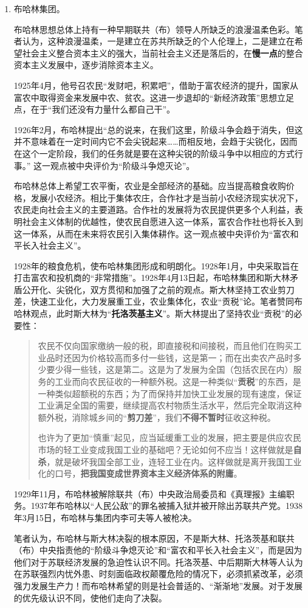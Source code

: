 \begin{enumerate}
\item 布哈林集团。

  布哈林思想总体上持有一种早期联共（布）领导人所缺乏的浪漫温柔色彩。笔者认为，这种浪漫温柔，一是建立在苏共所缺乏的个人伦理上，二是建立在希望社会主义整合资本主义的强大，当前社会主义还是落后的，在\textbf{慢一点}的整合资本主义发展中，逐步消除资本主义。

  1925年4月，他号召农民“发财吧，积累吧”，借助于富农经济的提升，国家从富农中取得资金来发展中农、贫农。这进一步退却的“新经济政策”思想立足点，在于“我们还没有力量什么都自己干”。

  1926年2月，布哈林提出“总的说来，在我们这里，阶级斗争会趋于消失，但这并不意味着在一定时间内它不会尖锐起来……而相反地，会趋于尖锐化，因而在这个一定阶段，我们的任务就是要在这种尖锐的阶级斗争中以相应的方式行事。” 这一观点被中央评价为“阶级斗争熄灭论”。

  布哈林总体上希望工农平衡，农业是全部经济的基础。应当提高粮食收购价格，发展小农经济。相比于集体农庄，合作社才是当前小农经济现实状况下，农民走向社会主义的主要道路。合作社的发展将为农民提供更多个人利益，表明社会主义体制的优越性，使农民自愿进入这一体系，富农合作社也将长入到这一体系，从而在未来将农民引入集体耕作。这一观点被中央评价为“富农和平长入社会主义”。

  1928年的粮食危机，使布哈林集团形成和明朗化。1928年1月，中央采取旨在打击富农和投机商的“非常措施”。1928年4月13日起，布哈林集团和斯大林矛盾公开化、尖锐化，双方贯彻和加强了之前的观点。斯大林坚持工农业剪刀差，快速工业化，大力发展重工业，农业集体化，农业“贡税”论。笔者赞同布哈林观点，此时斯大林为“\textbf{托洛茨基主义}”。斯大林提出了坚持农业“贡税”的必要性：
  \begin{quotation}农民不仅向国家缴纳一般的税，即直接税和间接税，而且他们在购买工业品时还因为价格较高而多付一些钱，这是第一；而在出卖农产品时多少要少得一些钱，这是第二。这是为了发展为全国（包括农民在内）服务的工业而向农民征收的一种额外税。这是一种类似“\textbf{贡税}”的东西，是一种类似超额税的东西；为了而保持并加快工业发展的现有速度，保证工业满足全国的需要，继续提高农村物质生活水平，然后完全取消这种额外税，消除城乡间的“\textbf{剪刀差}”，我们\textbf{不得不暂时}征收这种税。

    也许为了更加“慎重”起见，应当延缓重工业的发展，把主要是供应农民市场的轻工业变成我国工业的基础吧？无论如何不应当！这样做就是\textbf{自杀}，就是破坏我国全部工业，连轻工业在内。这样做就是离开我国工业化的口号，\textbf{把我国变成世界资本主义经济体系的附庸}。
  \end{quotation}

  1929年11月，布哈林被解除联共（布）中央政治局委员和《真理报》主编职务。1937年布哈林以“人民公敌”的罪名被捕入狱并被开除出苏联共产党。1938年3月15日，布哈林与集团内李可夫等人被枪决。

  笔者认为，布哈林与斯大林决裂的根本原因，不是斯大林、托洛茨基和联共（布）中央指责他的“阶级斗争熄灭论”和“富农和平长入社会主义”，而是因为他们对于苏联经济发展的急迫性认识不同。托洛茨基、中后期斯大林等人认为在苏联强烈内忧外患、时刻面临政权颠覆危险的情况下，必须抓紧改革，必须强力发展生产力！而布哈林希望的则是社会普适的、“渐渐地”发展。对于发展的优先级认识不同，使他们走向了决裂。
\end{enumerate}

